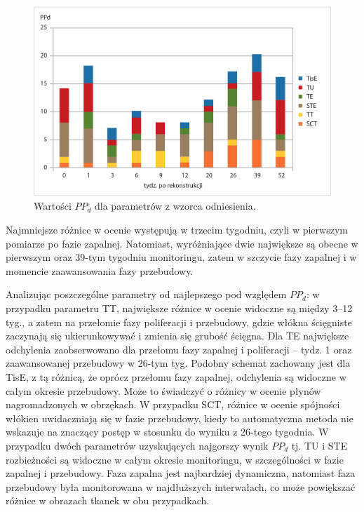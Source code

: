 \begin{figure}[h]
	\centering
	\includegraphics[width=1\textwidth]{figures/cm_summary.jpg}
	\caption{Wartości $PP_d$ dla parametrów z wzorca odniesienia.}\label{fig:CM_MAE_SUMMARY}
\end{figure}

Najmniejsze różnice w ocenie występują w trzecim tygodniu, czyli w pierwszym pomiarze po fazie zapalnej. Natomiast, wyróżniające dwie największe są obecne \linebreak w pierwszym oraz 39-tym tygodniu monitoringu, zatem w szczycie fazy zapalnej \linebreak i w momencie zaawansowania fazy przebudowy. 

Analizując poszczególne parametry od najlepszego pod względem $PP_d$: w przypadku parametru TT, największe różnice w ocenie widoczne są między 3--12 tyg., \linebreak a zatem na przełomie fazy poliferacji i przebudowy, gdzie włókna ścięgniste zaczynają się ukierunkowywać i zmienia się grubość ścięgna. Dla TE największe odchylenia zaobserwowano dla przełomu fazy zapalnej i poliferacji -- tydz. 1 oraz zaawansowanej przebudowy w 26-tym tyg. Podobny schemat zachowany jest dla TisE, \linebreak z tą różnicą, że oprócz przełomu fazy zapalnej, odchylenia są widoczne w całym okresie przebudowy. Może to świadczyć o różnicy w ocenie płynów nagromadzonych w obrzękach. W przypadku SCT, różnice w ocenie spójności włókien uwidaczniają się w fazie przebudowy, kiedy to automatyczna metoda nie wskazuje na znaczący postęp w stosunku do wyniku z 26-tego tygodnia. W przypadku dwóch parametrów uzyskujących najgorszy wynik $PP_d$ tj. TU i STE rozbieżności są widoczne \linebreak w całym okresie monitoringu, w szczególności w fazie zapalnej i przebudowy. Faza zapalna jest najbardziej dynamiczna, natomiast faza przebudowy była monitorowana w najdłuższych interwałach, co może powiększać różnice w obrazach tkanek \linebreak w obu przypadkach. 

